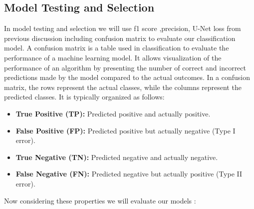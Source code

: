 \documentclass[12pt,a4paper]{report}
\begin{document}
		\label{Model Testing and Selection}
		\subsection{Model Testing and Selection} In model testing and selection we will use f1 score \cite{f1}  ,precision, U-Net loss from previous discussion including confusion matrix to evaluate our classification model.
		A confusion matrix is a table used in classification to evaluate the performance of a machine learning model. It allows visualization of the performance of an algorithm by presenting the number of correct and incorrect predictions made by the model compared to the actual outcomes. 
		In a confusion matrix, the rows represent the actual classes, while the columns represent the predicted classes. It is typically organized as follows:
		\begin{itemize}
		\item \textbf{True Positive (TP):} Predicted positive and actually positive.
    \item \textbf{False Positive (FP):} Predicted positive but actually negative (Type I error).
    \item \textbf{True Negative (TN):} Predicted negative and actually negative.
    \item \textbf{False Negative (FN):} Predicted negative but actually positive (Type II error).
		\end{itemize}
		Now considering these properties we will evaluate our models :\\
		
\end{document}
